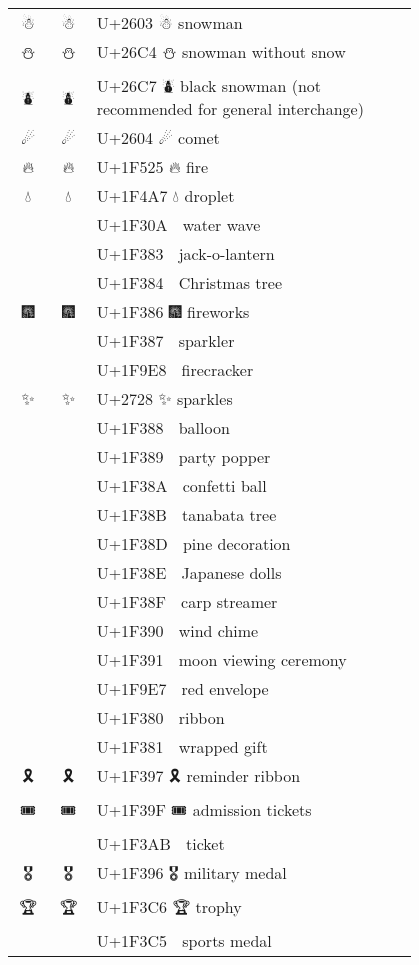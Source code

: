 \documentclass[a4paper,12pt]{article}
\newcommand{\fontA}[1]{{\fontspec[RawFeature={mode=harf,+dist,+ccmp}]{Segoe UI Emoji} #1}}
\newcommand{\fontB}[1]{{\fontspec[RawFeature={mode=harf,+dist,+ccmp}]{Noto Color Emoji} #1}}
\begin{document}
\begin{longtable}[c]{ccp{0.8\linewidth}}
\fontA{☃}&\fontB{☃}&U+2603 ☃ snowman\\
\fontA{⛄}&\fontB{⛄}&U+26C4 ⛄ snowman without snow\\
\fontA{⛇}&\fontB{⛇}&U+26C7 ⛇ black snowman (not recommended for general interchange)\\
\fontA{☄}&\fontB{☄}&U+2604 ☄ comet\\
\fontA{🔥}&\fontB{🔥}&U+1F525 🔥 fire\\
\fontA{💧}&\fontB{💧}&U+1F4A7 💧 droplet\\
\fontA{🌊}&\fontB{🌊}&U+1F30A 🌊 water wave\\
\fontA{🎃}&\fontB{🎃}&U+1F383 🎃 jack-o-lantern\\
\fontA{🎄}&\fontB{🎄}&U+1F384 🎄 Christmas tree\\
\fontA{🎆}&\fontB{🎆}&U+1F386 🎆 fireworks\\
\fontA{🎇}&\fontB{🎇}&U+1F387 🎇 sparkler\\
\fontA{🧨}&\fontB{🧨}&U+1F9E8 🧨 firecracker\\
\fontA{✨}&\fontB{✨}&U+2728 ✨ sparkles\\
\fontA{🎈}&\fontB{🎈}&U+1F388 🎈 balloon\\
\fontA{🎉}&\fontB{🎉}&U+1F389 🎉 party popper\\
\fontA{🎊}&\fontB{🎊}&U+1F38A 🎊 confetti ball\\
\fontA{🎋}&\fontB{🎋}&U+1F38B 🎋 tanabata tree\\
\fontA{🎍}&\fontB{🎍}&U+1F38D 🎍 pine decoration\\
\fontA{🎎}&\fontB{🎎}&U+1F38E 🎎 Japanese dolls\\
\fontA{🎏}&\fontB{🎏}&U+1F38F 🎏 carp streamer\\
\fontA{🎐}&\fontB{🎐}&U+1F390 🎐 wind chime\\
\fontA{🎑}&\fontB{🎑}&U+1F391 🎑 moon viewing ceremony\\
\fontA{🧧}&\fontB{🧧}&U+1F9E7 🧧 red envelope\\
\fontA{🎀}&\fontB{🎀}&U+1F380 🎀 ribbon\\
\fontA{🎁}&\fontB{🎁}&U+1F381 🎁 wrapped gift\\
\fontA{🎗}&\fontB{🎗}&U+1F397 🎗 reminder ribbon\\
\fontA{🎟}&\fontB{🎟}&U+1F39F 🎟 admission tickets\\
\fontA{🎫}&\fontB{🎫}&U+1F3AB 🎫 ticket\\
\fontA{🎖}&\fontB{🎖}&U+1F396 🎖 military medal\\
\fontA{🏆}&\fontB{🏆}&U+1F3C6 🏆 trophy\\
\fontA{🏅}&\fontB{🏅}&U+1F3C5 🏅 sports medal\\

\end{longtable}
\end{document}

